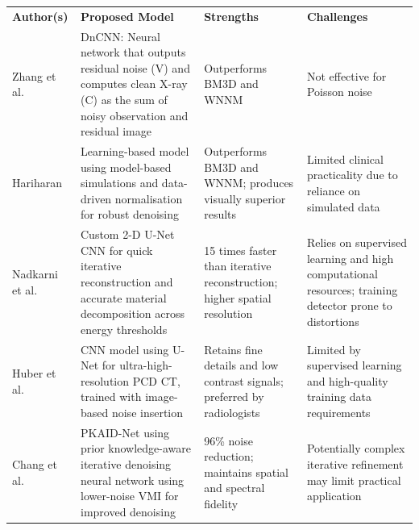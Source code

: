 \begin{center}
\small
\setlength{\arrayrulewidth}{1mm} %
\setlength{\tabcolsep}{6pt} %
\renewcommand{\arraystretch}{1.5} %

\begin{longtable}{ p{}  p{}   p{}   p{} }
\rowcolor[HTML]{D3D3D3} 
\textbf{Author(s)} & \textbf{Proposed Model}  & \textbf{Strengths} & \textbf{Challenges} \\
\rowcolor[HTML]{FFFFFF} 
Zhang et al. \cite{7839189} & \gls{DnCNN}: Neural network that outputs residual noise (V) and computes clean X-ray (C) as the sum of noisy observation and residual image & Outperforms \gls{BM3D} and \gls{WNNM} & Not effective for Poisson noise \\
\rowcolor[HTML]{F3F3F3} 
Hariharan \cite{hariharan_learning-based_2019} & Learning-based model using model-based simulations and data-driven normalisation for robust denoising & Outperforms \gls{BM3D} and \gls{WNNM}; produces visually superior results & Limited clinical practicality due to reliance on simulated data \\
\rowcolor[HTML]{FFFFFF} 
Nadkarni et al. \cite{nadkarni_deep_2023} & Custom 2-D \gls{U-Net} \gls{CNN} for quick iterative reconstruction and accurate material decomposition across energy thresholds & 15 times faster than iterative reconstruction; higher spatial resolution & Relies on supervised learning and high computational resources; training detector prone to distortions \\
\rowcolor[HTML]{F3F3F3} 
Huber et al. \cite{huber_dedicated_2022} & \gls{CNN} model using \gls{U-Net} for ultra-high-resolution \gls{PCD} \gls{CT}, trained with image-based noise insertion & Retains fine details and low contrast signals; preferred by radiologists & Limited by supervised learning and high-quality training data requirements \\
\rowcolor[HTML]{FFFFFF} 
Chang et al. \cite{chang_improved_2024} & \gls{PKAID-Net} using prior knowledge-aware iterative denoising neural network using lower-noise \gls{VMI} for improved denoising & 96\% noise reduction; maintains spatial and spectral fidelity & Potentially complex iterative refinement may limit practical application \\

\end{longtable}
\end{center}
